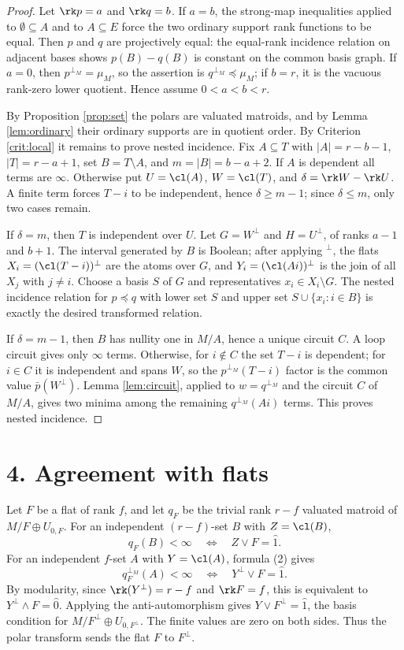 \begin{proof}
Let $\rk p=a$ and $\rk q=b$.  If $a=b$, the strong-map inequalities applied to
$\emptyset\subseteq A$ and to $A\subseteq E$ force the two ordinary
support rank functions to be equal.  Then $p$ and $q$ are projectively
equal: the equal-rank incidence relation on adjacent bases shows
$p(B)-q(B)$ is constant on the common basis graph.  If $a=0$, then $p^{\perp_M}=\mu_M$, so the
assertion is $q^{\perp_M}\preceq\mu_M$; if $b=r$, it is the vacuous
rank-zero lower quotient.  Hence assume $0<a<b<r$.

By Proposition \ref{prop:set} the polars are valuated matroids, and by
Lemma \ref{lem:ordinary} their ordinary supports are in quotient order.
By Criterion \ref{crit:local} it remains to prove nested incidence.
Fix $A\subseteq T$ with
$|A|=r-b-1$, $|T|=r-a+1$, set $B=T\setminus A$, and
$m=|B|=b-a+2$.  If $A$ is dependent all terms are $\infty$.  Otherwise
put $U=\cl(A)$, $W=\cl(T)$, and $\delta=\rk W-\rk U$.  A finite term
forces $T-i$ to be independent, hence $\delta\ge m-1$; since
$\delta\le m$, only two cases remain.

If $\delta=m$, then $T$ is independent over $U$.  Let $G=W^\perp$ and
$H=U^\perp$, of ranks $a-1$ and $b+1$.  The interval generated by $B$
is Boolean; after applying $^\perp$, the flats
$X_i=(\cl(T-i))^\perp$ are the atoms over $G$, and
$Y_i=(\cl(Ai))^\perp$ is the join of all $X_j$ with $j\ne i$.  Choose a
basis $S$ of $G$ and representatives $x_i\in X_i\setminus G$.  The
nested incidence relation for $p\preceq q$ with lower set $S$ and upper
set $S\cup\{x_i:i\in B\}$ is exactly the desired transformed relation.

If $\delta=m-1$, then $B$ has nullity one in $M/A$, hence a unique
circuit $C$.  A loop circuit gives only $\infty$ terms.  Otherwise, for
$i\notin C$ the set $T-i$ is dependent; for $i\in C$ it is independent
and spans $W$, so the $p^{\perp_M}(T-i)$ factor is the common value
$\bar p(W^\perp)$.  Lemma \ref{lem:circuit}, applied to
$w=q^{\perp_M}$ and the circuit $C$ of $M/A$, gives two minima among
the remaining $q^{\perp_M}(Ai)$ terms.  This proves nested incidence.
\end{proof}

\section*{4. Agreement with flats}

Let $F$ be a flat of rank $f$, and let $q_F$ be the trivial rank
$r-f$ valuated matroid of $M/F\oplus U_{0,F}$.  For an independent
$(r-f)$-set $B$ with $Z=\cl(B)$,
\[
        q_F(B)<\infty\quad\Longleftrightarrow\quad Z\vee F=\hat1.
\]
For an independent $f$-set $A$ with $Y=\cl(A)$, formula (2) gives
\[
 q_F^{\perp_M}(A)<\infty
 \quad\Longleftrightarrow\quad Y^\perp\vee F=\hat1 .
\]
By modularity, since $\rk(Y^\perp)=r-f$ and $\rk F=f$, this is
equivalent to $Y^\perp\wedge F=\hat0$.  Applying the anti-automorphism
gives $Y\vee F^\perp=\hat1$, the basis condition for
$M/F^\perp\oplus U_{0,F^\perp}$.  The finite values are zero on both
sides.  Thus the polar transform sends the flat $F$ to $F^\perp$.

